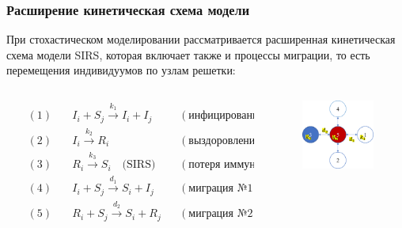 \documentclass[
    11pt, %
    aspectratio=169, %
]{beamer}
\begin{document}
\begin{frame}
	\frametitle{Расширение кинетическая схема модели}
    \fontsize{8}{10}\selectfont{}

    При стохастическом моделировании рассматривается расширенная кинетическая схема модели SIRS, которая включает также и процессы миграции, то есть перемещения индивидуумов по узлам решетки:

    \vspace{-0.2cm}

    \begin{columns}[t] %
        \begin{column}{0.02\textwidth}
        \end{column}

        \begin{column}{0.38\textwidth}
            \begin{align*}
                (1) \quad& I_{i}+S_{j} \stackrel{k_{1}}{\rightarrow} I_{i}+I_{j}  &&( \text{инфицирование}  ) \\
                (2) \quad& I_{i} \stackrel{k_{2}}{\rightarrow} R_{i}   &&(\text{выздоровление} ) \\
                (3) \quad& R_{i} \stackrel{k_{3}}{\rightarrow} S_{i} \quad \text{(SIRS)}  &&( \text{потеря иммунитета} ) \\
                (4) \quad& I_{i}+S_{j} \stackrel{d_{1}}{\rightarrow} S_{i}+I_{j}   &&(\text{миграция №1}  ) \\
                (5) \quad& R_{i}+S_{j} \stackrel{d_{2}}{\rightarrow} S_{i}+R_{j}   &&(\text{миграция №2}  ) \\
            \end{align*}
        \end{column}

        \begin{column}{0.28\textwidth}
            \begin{figure}
                \vspace{-0.1cm}
                \hspace{-0.3cm}
                \centering
                \includegraphics[angle=0, width=3.2cm]{KineticPrinciple-2.png}
            \end{figure}
        \end{column}


\end{columns}
\end{frame}
\end{document}
